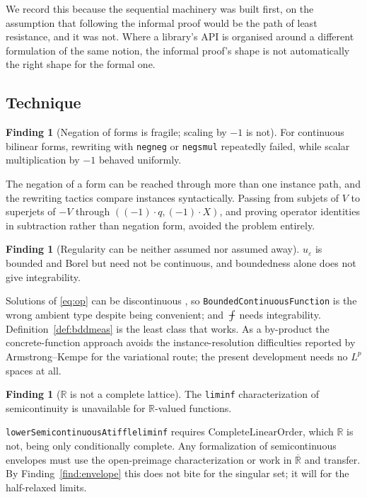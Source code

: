 \documentclass[11pt,reqno]{amsart}
\newcommand{\fint}{\mathop{\mathrlap{\,\rule[0.62ex]{0.62em}{0.5pt}}\int}}
\newcommand{\LEANREF}[1]{\texttt{\small\def\_{\textunderscore\allowbreak}#1}}
\newcommand{\R}{\mathbb{R}}
\newcommand{\eps}{\varepsilon}
\newcommand{\avgint}{\fint}
\theoremstyle{plain}
\theoremstyle{definition}
\newtheorem{finding}[theorem]{Finding}
\begin{document}
We record this because the sequential machinery was built first, on the
assumption that following the informal proof would be the path of least
resistance, and it was not. Where a library's API is organised around a
different formulation of the same notion, the informal proof's shape is not
automatically the right shape for the formal one.

\subsection{Technique}

\begin{finding}[Negation of forms is fragile; scaling by $-1$ is
not]\label{find:negone}
For continuous bilinear forms, rewriting with \LEANREF{neg\_neg} or
\LEANREF{neg\_smul} repeatedly failed, while scalar multiplication by $-1$
behaved uniformly.
\end{finding}

The negation of a form can be reached through more than one instance path, and
the rewriting tactics compare instances syntactically. Passing from subjets of
$V$ to superjets of $-V$ through $((-1) \cdot q, (-1) \cdot X)$, and proving
operator identities in subtraction rather than negation form, avoided the
problem entirely.

\begin{finding}[Regularity can be neither assumed nor assumed
away]\label{find:reg}
$u_\eps$ is bounded and Borel but need not be continuous, and boundedness alone
does not give integrability.
\end{finding}

Solutions of \eqref{eq:op} can be discontinuous \cite{LPS14}, so
\LEANREF{BoundedContinuousFunction} is the wrong ambient type despite being
convenient; and $\avgint$ needs integrability. Definition~\ref{def:bddmeas} is
the least class that works. As a by-product the concrete-function approach
avoids the instance-resolution difficulties reported by Armstrong--Kempe
\cite{AK26} for the variational route; the present development needs no $L^p$
spaces at all.

\begin{finding}[$\R$ is not a complete lattice]\label{find:complete}
The \texttt{liminf} characterization of semicontinuity is unavailable for
$\R$-valued functions.
\end{finding}

\LEANREF{lowerSemicontinuousAt\_iff\_le\_liminf} requires
$\mathrm{CompleteLinearOrder}$, which $\R$ is not, being only conditionally
complete. Any formalization of semicontinuous envelopes must use the
open-preimage characterization or work in $\overline{\R}$ and transfer. By
Finding~\ref{find:envelope} this does not bite for the singular set; it will
for the half-relaxed limits.
\end{document}
